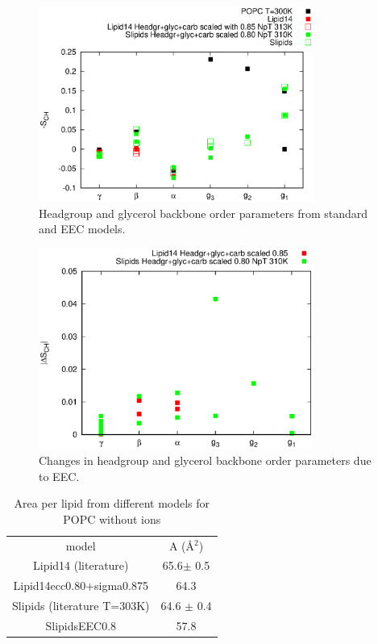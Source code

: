 \documentclass[aip,jcp]{revtex4}
\begin{document}
\begin{figure}[]
  \centering
  \includegraphics[width=9.0cm]{../Fig/HGopsNEWmodels.eps}
  \caption{\label{HGopsNEWmodels}
    Headgroup and glycerol backbone order parameters from standard and EEC models.}
\end{figure}

\begin{figure}[]
  \centering
  \includegraphics[width=9.0cm]{../Fig/HGopsNEWmodelsCHANGE.eps}
  \caption{\label{HGopsNEWmodelsCHANGE}
    Changes in headgroup and glycerol backbone order parameters due to EEC.}
\end{figure}


\begin{table}
  \caption{Area per lipid from different models for POPC without ions\label{apls} }
  \begin{tabular}{c c}
    model          & A (Å$^2$)    \\
    Lipid14 (literature)  & 65.6$\pm$ 0.5   \\
    Lipid14ecc0.80+sigma0.875 & 64.3      \\
    Slipids (literature T=303K)       & 64.6 $\pm$ 0.4   \\
    SlipidsEEC0.8  & 57.8  \\
  \end{tabular}
\end{table}
\end{document}
